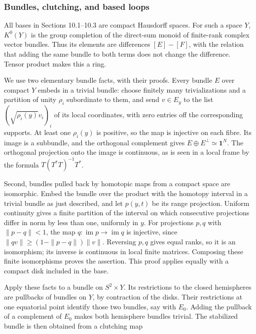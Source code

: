 \subsubsection{Bundles, clutching, and based loops}
\label{courseIII:almost-complex-structures-and-integrability:section-10.1}

All bases in Sections 10.1--10.3 are compact Hausdorff spaces. For such a space \(Y\), \(K^0(Y)\) is the group completion of the direct-sum monoid of finite-rank complex vector bundles. Thus its elements are differences \([E]-[F]\), with the relation that adding the same bundle to both terms does not change the difference. Tensor product makes this a ring.

We use two elementary bundle facts, with their proofs. Every bundle \(E\) over compact \(Y\) embeds in a trivial bundle: choose finitely many trivializations and a partition of unity \(\rho_i\) subordinate to them, and send \(v\in E_y\) to the list \((\sqrt{\rho_i(y)}v_i)_i\) of its local coordinates, with zero entries off the corresponding supports. At least one \(\rho_i(y)\) is positive, so the map is injective on each fibre. Its image is a subbundle, and the orthogonal complement gives \(E\oplus E^\perp\simeq\mathbf1^N\). The orthogonal projection onto the image is continuous, as is seen in a local frame by the formula \(T(T^*T)^{-1}T^*\).

Second, bundles pulled back by homotopic maps from a compact space are isomorphic. Embed the bundle over the product with the homotopy interval in a trivial bundle as just described, and let \(p(y,t)\) be its range projection. Uniform continuity gives a finite partition of the interval on which consecutive projections differ in norm by less than one, uniformly in \(y\). For projections \(p,q\) with \(\|p-q\|<1\), the map \(q:\operatorname{im}p\to\operatorname{im}q\) is injective, since \(\|qv\|\geq(1-\|p-q\|)\|v\|\). Reversing \(p,q\) gives equal ranks, so it is an isomorphism; its inverse is continuous in local finite matrices. Composing these finite isomorphisms proves the assertion. This proof applies equally with a compact disk included in the base.

Apply these facts to a bundle on \(S^2\times Y\). Its restrictions to the closed hemispheres are pullbacks of bundles on \(Y\), by contraction of the disks. Their restrictions at one equatorial point identify those two bundles, say with \(E_0\). Adding the pullback of a complement of \(E_0\) makes both hemisphere bundles trivial. The stabilized bundle is then obtained from a clutching map

